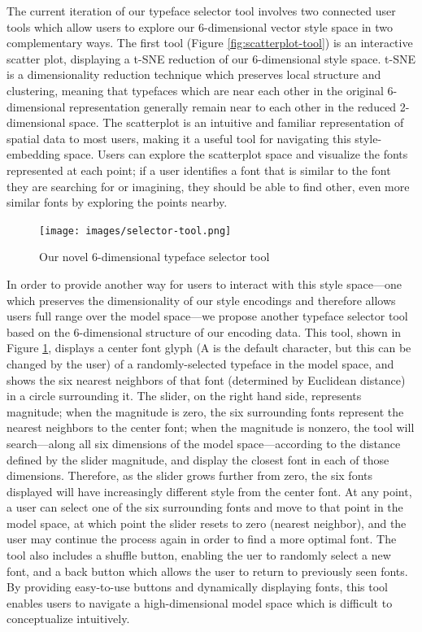 The current iteration of our typeface selector tool involves two connected user tools which allow users to explore our 6-dimensional vector style space in two complementary ways. The first tool (Figure \ref{fig:scatterplot-tool}) is an interactive scatter plot, displaying a t-SNE reduction of our 6-dimensional style space. t-SNE is a dimensionality reduction technique which preserves local structure and clustering, meaning that typefaces which are near each other in the original 6-dimensional representation generally remain near to each other in the reduced 2-dimensional space. The scatterplot is an intuitive and familiar representation of spatial data to most users, making it a useful tool for navigating this style-embedding space. Users can explore the scatterplot space and visualize the fonts represented at each point; if a user identifies a font that is similar to the font they are searching for or imagining, they should be able to find other, even more similar fonts by exploring the points nearby. 

\begin{figure}[h]
    \centering
    \texttt{[image: images/selector-tool.png]}
    \caption{Our novel 6-dimensional typeface selector tool}
    \label{fig:selector-tool}
\end{figure}

In order to provide another way for users to interact with this style space—one which preserves the dimensionality of our style encodings and therefore allows users full range over the model space—we propose another typeface selector tool based on the 6-dimensional structure of our encoding data. This tool, shown in Figure \ref{fig:selector-tool}, displays a center font glyph (A is the default character, but this can be changed by the user) of a randomly-selected typeface in the model space, and shows the six nearest neighbors of that font (determined by Euclidean distance) in a circle surrounding it. The slider, on the right hand side, represents magnitude; when the magnitude is zero, the six surrounding fonts represent the nearest neighbors to the center font; when the magnitude is nonzero, the tool will search—along all six dimensions of the model space—according to the distance defined by the slider magnitude, and display the closest font in each of those dimensions. Therefore, as the slider grows further from zero, the six fonts displayed will have increasingly different style from the center font. At any point, a user can select one of the six surrounding fonts and move to that point in the model space, at which point the slider resets to zero (nearest neighbor), and the user may continue the process again in order to find a more optimal font. The tool also includes a shuffle button, enabling the uer to randomly select a new font, and a back button which allows the user to return to previously seen fonts. By providing easy-to-use buttons and dynamically displaying fonts, this tool enables users to navigate a high-dimensional model space which is difficult to conceptualize intuitively.

